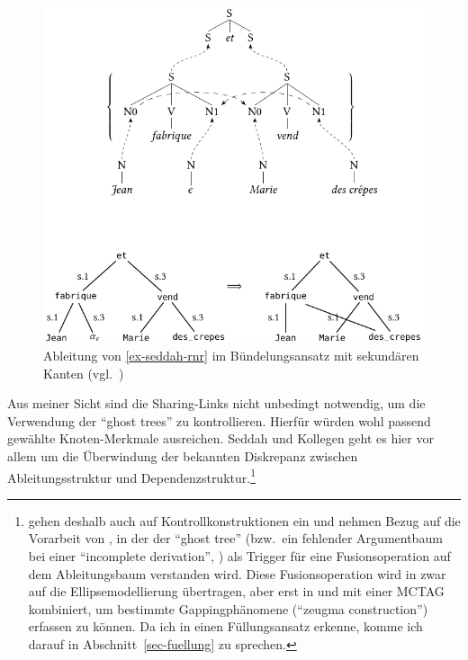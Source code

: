 \begin{figure}[t]
\centering
\includegraphics{graphics/abb813.pdf}
\caption{\label{fig-seddah-rnr-2}Ableitung von \ref{ex-seddah-rnr} im Bündelungsansatz mit sekundären Kanten (vgl.\ \citealt[Figure~2]{Seddah:etal:10})}
\end{figure}
   
Aus meiner Sicht sind die Sharing-Links nicht unbedingt notwendig, um die Verwendung der "`ghost trees"' zu kontrollieren. Hierfür würden wohl passend gewählte Knoten-Merkmale ausreichen. Seddah und Kollegen geht es hier vor allem um die Überwindung der bekannten Diskrepanz zwischen Ableitungsstruktur und Dependenzstruktur.\footnote{\cite{Seddah:etal:10} gehen deshalb auch auf Kontrollkonstruktionen ein und nehmen Bezug auf die Vorarbeit von \cite{Seddah:Gaiffe:05}, in der der "`ghost tree"' (bzw.\ ein fehlender Argumentbaum bei einer "`incomplete derivation"', \citealt[292]{Seddah:Gaiffe:05}) als Trigger für eine Fusionsoperation auf dem Ableitungsbaum verstanden wird. Diese Fusionsoperation wird in \cite{Seddah:Sagot:06} zwar auf die Ellipsemodellierung übertragen, aber erst in \cite{Seddah:08} und \cite{Seddah:etal:10} mit einer MCTAG kombiniert, um bestimmte Gappingphänomene ("`zeugma construction"') erfassen zu können. Da ich in \cite{Seddah:Sagot:06} einen Füllungsansatz erkenne, komme ich darauf in Abschnitt~\ref{sec-fuellung} zu sprechen.} 


